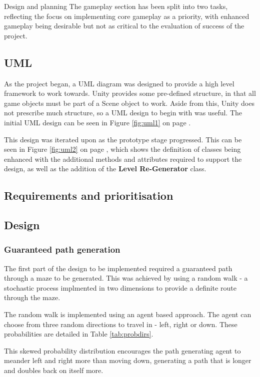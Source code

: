 \documentclass[progress]{cmpreport}
\begin{document}
\begin{section}{Design and planning}
The gameplay section has been split into two tasks, reflecting the focus on implementing core gameplay as a priority, with enhanced gameplay being desirable but not as critical to the evaluation of success of the project.


\subsection{UML}

As the project began, a UML diagram was designed to provide a high level framework to work towards. Unity provides some pre-defined structure, in that all game objects must be part of a Scene object to work. Aside from this, Unity does not prescribe much structure, so a UML design to begin with was useful. The initial UML design can be seen in Figure \ref{fig:uml1} on page \pageref{fig:uml1}.

This design was iterated upon as the prototype stage progressed. This can be seen in Figure \ref{fig:uml2} on page \pageref{fig:uml2}, which shows the definition of classes being enhanced with the additional methods and attributes required to support the design, as well as the addition of the \textbf{Level Re-Generator} class.


\subsection{Requirements and prioritisation}

\subsection{Design}
\subsubsection{Guaranteed path generation}
The first part of the design to be implemented required a guaranteed path through a maze to be generated. This was achieved by using a random walk - a stochastic process implmented in two dimensions to provide a definite route through the maze.

The random walk is implemented using an agent based approach. The agent can choose from three random directions to travel in - left, right or down. These probabilities are detailed in Table \ref{tab:probdirs}.



This skewed probability distribution encourages the path generating agent to meander left and right more than moving down, generating a path that is longer and doubles back on itself more.



\end{section}
\end{document}

